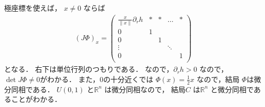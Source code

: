 \documentclass[leqno, a4paper, 12pt, dvipdfmx]{jsarticle}
\newcommand{\rr}{\mathbb{R}}
\begin{document}
極座標を使えば，
$x\neq 0$
ならば
\begin{align*}
(J\Phi)_{x}
=
\left(
\begin{array}{c|cccc}
\frac{x}{\|x\|}\partial_{r}h & * & * & \dots & *\\
\hline
0                                    & 1 &   &          & \\
0                                    &  &  1 &          & \\
\vdots                             &  &   &  \ddots        &\\
0                             &  &   &          &1\\
\end{array}
\right)
\end{align*}
となる．
右下は単位行列のつもりである．
なので，$\partial_{r}h>0$
なので，$\det J\Phi\neq 0$がわかる．
また，$0$の十分近くでは
$\Phi(x)=\frac{1}{2}x$
なので，結局
$\Phi$は微分同相である．
$U(0, 1)$
と$\rr^{n}$
は微分同相なので，
結局$C$
は$\rr^{n}$
と微分同相であることがわかる．
\end{document}

